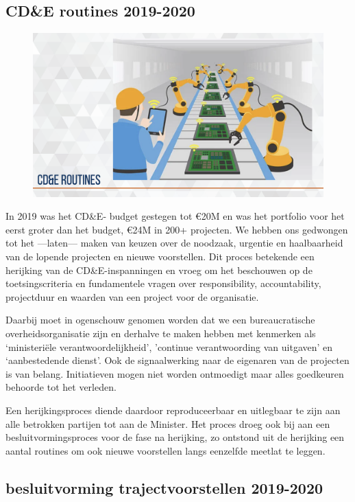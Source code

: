 \documentclass[
]{book}
\begin{document}
\hypertarget{cde-routines-2019-2020}{%
\subsection{CD\&E routines 2019-2020}\label{cde-routines-2019-2020}}

\begin{figure}

{\centering \includegraphics[width=0.5\linewidth]{data/keynote-slides/20200430-CDE-Designprocess/20200430-CDE-Designprocess.034} 

}

\caption{ }\label{fig:unnamed-chunk-25}
\end{figure}

In 2019 was het CD\&E- budget gestegen tot €20M en was het portfolio voor het eerst groter dan het budget, €24M in 200+ projecten. We hebben ons gedwongen tot het ---laten--- maken van keuzen over de noodzaak, urgentie en haalbaarheid van de lopende projecten en nieuwe voorstellen. Dit proces betekende een herijking van de CD\&E-inspanningen en vroeg om het beschouwen op de toetsingscriteria en fundamentele vragen over responsibility, accountability, projectduur en waarden van een project voor de organisatie.

Daarbij moet in ogenschouw genomen worden dat we een bureaucratische overheidsorganisatie zijn en derhalve te maken hebben met kenmerken als `ministeriële verantwoordelijkheid', 'continue verantwoording van uitgaven' en `aanbestedende dienst'. Ook de signaalwerking naar de eigenaren van de projecten is van belang. Initiatieven mogen niet worden ontmoedigt maar alles goedkeuren behoorde tot het verleden.

Een herijkingsproces diende daardoor reproduceerbaar en uitlegbaar te zijn aan alle betrokken partijen tot aan de Minister. Het proces droeg ook bij aan een besluitvormingsproces voor de fase na herijking, zo ontstond uit de herijking een aantal routines om ook nieuwe voorstellen langs eenzelfde meetlat te leggen.

\hypertarget{besluitvorming-trajectvoorstellen-2019-2020}{%
\subsection{besluitvorming trajectvoorstellen 2019-2020}\label{besluitvorming-trajectvoorstellen-2019-2020}}
\end{document}
